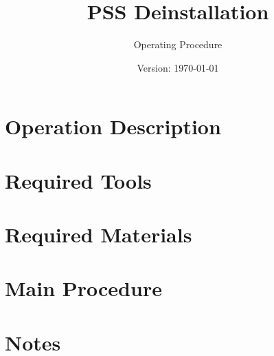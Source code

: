 \documentclass{article}
\title{PSS Deinstallation}
\author{Operating Procedure}
\date{Version: \isodate\today}
\begin{document}
\maketitle

\thispagestyle{fancy}

\renewcommand{\thesection}{\Alph{section}}

\section{Operation Description}


\section{Required Tools}


\section{Required Materials}


\newpage

\renewcommand{\thesection}{\arabic{section}}

\setcounter{section}{0}

\section{Main Procedure}


\newpage

\setcounter{section}{0}
\section*{Notes}

\end{document}
